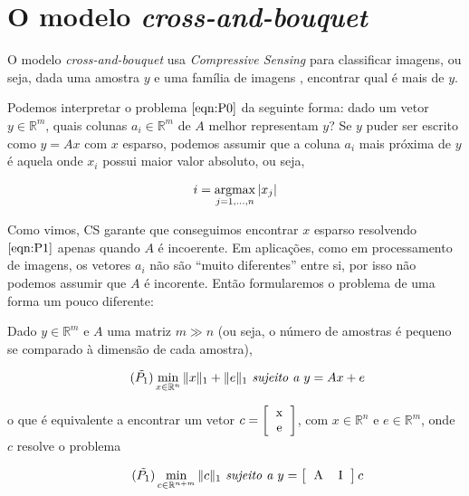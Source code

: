 \chapter{O modelo \textit{cross-and-bouquet}}


O modelo \textit{cross-and-bouquet} usa \textit{Compressive Sensing} para classificar imagens, ou seja, dada uma amostra $y$ e uma família de imagens , encontrar qual  é mais  de $y$.

Podemos interpretar o problema $\eqref{eqn:P0}$ da seguinte forma: dado um vetor $y \in \mathbb{R}^m$, quais colunas $a_i \in \mathbb{R}^m$ de $A$ melhor representam $y$? Se $y$ puder ser escrito como $y = Ax$ com $x$ esparso, podemos assumir que a coluna $a_i$ mais próxima de $y$ é aquela onde $x_i$ possui maior valor absoluto, ou seja,

$$ i = \argmax_{j = 1, \hdots, n} \vert x_j \vert $$

Como vimos, CS garante que conseguimos encontrar $x$ esparso resolvendo $\eqref{eqn:P1}$ apenas quando $A$ é incoerente. Em aplicações, como em processamento de imagens, os vetores $a_i$ não são ``muito diferentes'' entre si, por isso não podemos assumir que $A$ é incorente. Então formularemos o problema de uma forma um pouco diferente:

Dado $y \in \mathbb{R}^m$ e $A$ uma matriz $m \gg n$ (ou seja, o número de amostras é pequeno se comparado à dimensão de cada amostra),

\begin{equation}
\tag{$\tilde{P_1}$}
\min_{x \in \mathbb{R}^n} \Vert x \Vert_{1} + \Vert e \Vert_{1} \textit{ sujeito a } y = Ax + e
\end{equation}

o que é equivalente a encontrar um vetor $c = \left[ \begin{tabular}{c}
x \\
e
\end{tabular} \right]$, com $x \in \mathbb{R}^n$ e $e \in \mathbb{R}^m$, onde $c$ resolve o problema

\begin{equation}
\tag{$\tilde{P_1}$}
\min_{c \in \mathbb{R}^{n + m}} \Vert c \Vert_{1} \textit{ sujeito a } y = \left[ \begin{tabular}{c c} A &  I \end{tabular} \right] c
\label{eqn:P1_tilde}
\end{equation}

